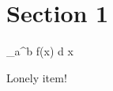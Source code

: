 
\usepackage{lipsum}



    \section{Section 1}
    \lipsum[1-3]

    \int_{a}^{b} f(x) d x
    
    \item Lonely item!


